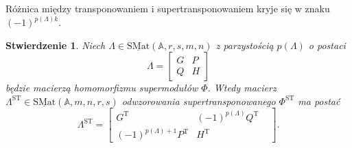 \documentclass[11pt,a4paper]{report}
\newtheorem{proposition}[theorem]{Stwierdzenie}
\theoremstyle{definition}
\begin{document}
Różnica między transponowaniem i supertransponowaniem kryje się w znaku $(-1)^{p(\Lambda)k}.$
 
\begin{proposition}
 Niech $\Lambda \in \underline{\mathrm{SMat}}(\mathbb{A},r,s,m,n)$ z parzystością $p(\Lambda)$ o postaci
 $$\Lambda = \begin{bmatrix}
      G & P \\
      Q & H
     \end{bmatrix}\!\!$$
 będzie macierzą homomorfizmu supermodułów $\Phi$. Wtedy macierz $\Lambda^{\mathrm{ST}} \in \underline{\mathrm{SMat}}(\mathbb{A},m,n,r,s)$ odwzorowania supertransponowanego $\Phi^{\mathrm{ST}}$ ma postać
 $$\Lambda^{\mathrm{ST}} = \begin{bmatrix}
      G^\mathrm{T}&  (-1)^{p(\Lambda)}Q^\mathrm{T}& \\
      (-1)^{p(\Lambda)+1}P^\mathrm{T}&  H^\mathrm{T}&
     \end{bmatrix}\!\!.$$
\end{proposition}
\end{document}
